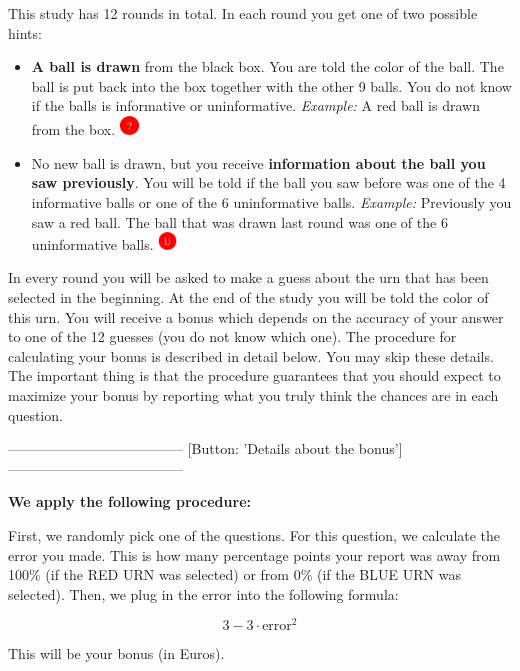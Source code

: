 This study has 12 rounds in total. In each round you get one of two possible hints: 
\begin{itemize}
    \item \textbf{A ball is drawn} from the black box. You are told the color of the ball. The ball is put back into the box together with the other 9 balls. You do not know if the balls is informative or uninformative. \textit{Example:} A red ball is drawn from the box. \includegraphics[width=0.5cm]{instructions/red_ball_q.png}
    \item No new ball is drawn, but you receive \textbf{information about the ball you saw previously}. You will be told if the ball you saw before was one of the 4 informative balls or one of the 6 uninformative balls. \textit{Example:} Previously you saw a red ball. The ball that was drawn last round was one of the 6 uninformative balls. \includegraphics[width=0.5cm]{instructions/red_ball_u.png} 
\end{itemize}

\noindent In every round you will be asked to make a guess about the urn that has been selected in the beginning. At the end of the study you will be told the color of this urn. You will receive a bonus which depends on the accuracy of your answer to one of the 12 guesses (you do not know which one). The procedure for calculating your bonus is described in detail below. You may skip these details. The important thing is that the procedure guarantees that you should expect to maximize your bonus by reporting what you truly think the chances are in each question. 

-------------------------------------- [Button: 'Details about the bonus'] --------------------------------------

\noindent\textbf{We apply the following procedure: 
}

\noindent First, we randomly pick one of the questions. For this question, we calculate the error you made. This is how many percentage points your report was away from 100\% (if the RED URN was selected) or from 0\% (if the BLUE URN was selected). Then, we plug in the error into the following formula: 

$$3-3 \cdot \text{error}^2$$

 \noindent This will be your bonus (in Euros). 

